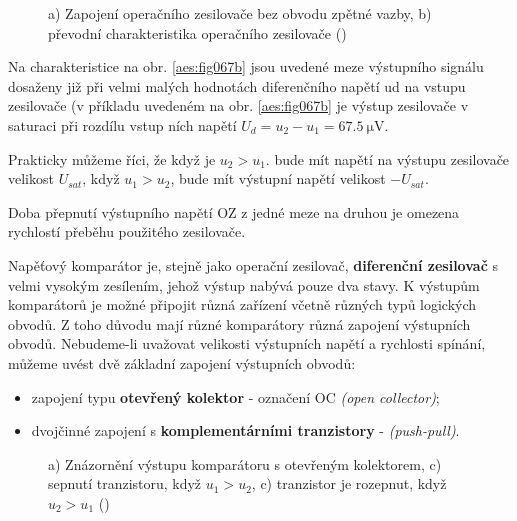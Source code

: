     \begin{figure}[ht!]  %
      \centering
       \newline    
      \caption{a) Zapojení operačního zesilovače bez obvodu zpětné vazby, b) převodní
              charakteristika operačního zesilovače (\cite[s.~177]{Dolecek2007})}
      \label{aes:fig067}
    \end{figure}

    Na charakteristice na obr. \ref{aes:fig067b} jsou uvedené meze výstupního signálu dosaže­ny již
    při velmi malých hodnotách diferenčního napětí ud na vstupu zesilovače (v příkladu uvedeném na
    obr. \ref{aes:fig067b} je výstup zesilovače v saturaci při rozdílu vstup­ ních napětí \(U_d =
    u_2 - u_1 = \SI{67.5}{\micro\volt}\).

    Prakticky můžeme říci, že když je \(u_2 > u_1\). bude mít napětí na výstupu zesilovače velikost
    \(U_{sat}\), když \(u_1 > u_2\), bude mít výstupní napětí velikost \(-U_{sat}\).

    \begin{mdframed}[style=mdnote] 
      Doba přepnutí výstupního napětí OZ z jedné meze na druhou je omezena rychlostí přeběhu
      použitého zesilovače.
    \end{mdframed}

    Napěťový komparátor je, stejně jako operační zesilovač, \textbf{diferenční zesilovač} s velmi
    vysokým zesílením, jehož výstup nabývá pouze dva stavy. K výstupům komparátorů je možné připojit
    různá zařízení včetně různých typů logických obvodů. Z toho důvodu mají různé komparátory různá
    zapojení výstupních obvodů. Nebudeme-li uvažovat velikosti výstupních napětí a rychlosti
    spínání, můžeme uvést dvě základní zapojení výstupních obvodů:
    \begin{itemize}[noitemsep]
      \item zapojení typu \textbf{otevřený kolektor} - označení OC \emph{(open collector)};
      \item dvojčinné zapojení s \textbf{komplementárními tranzistory} - \emph{(push-pull)}.
    \end{itemize}

    \begin{figure}[ht!]  %
      \centering
       \newline    
       \newline
      \caption{a) Znázornění výstupu komparátoru s otevřeným kolektorem, c) sepnutí tranzistoru, 
              když  \(u_1 > u_2\), c) tranzistor je rozepnut, když \(u_2 > u_1\) 
              (\cite[s.~177]{Dolecek2007})}
      \label{aes:fig068}
    \end{figure}

